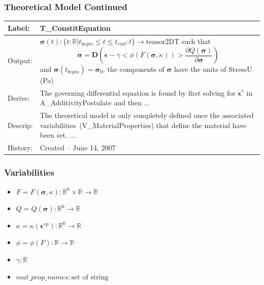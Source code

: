\documentclass[t,12pt,numbers,fleqn]{beamer}
\newcommand{\colAwidth}{0.15\textwidth}
\newcommand{\colBwidth}{0.7\textwidth}
\begin{document}
\begin{frame}

\frametitle{Theoretical Model Continued}

\begin{minipage}{\textwidth}
\begin{tabular}{| p{\colAwidth} | p{\colBwidth}|}
\hline
\rowcolor[gray]{0.9}
Label: & T\_ConstitEquation\\
\hline
Output: & $\bm{\sigma}(t): \{ t: \mathbb{R} | t_{\mathit{begin}} \leq t \leq t_{\mathit{end}} : t \} \rightarrow
\mbox{tensor2DT}$ such that 
$$\dot{\bm{\sigma}} = \mathbf{D} \left ( \dot{\bm{\epsilon}} - \gamma < \phi (F(\bm{\sigma},\kappa) ) >
\frac {
\partial Q (\bm{\sigma})}{
\partial \bm{\sigma}} \right )
$$ 
and $\bm{\sigma}(t_{\mathit{begin}}) = \bm{\sigma}_0$,
the components of $\bm{\sigma}$ have the units of StressU (Pa)\\
\hline
Derive: & The governing differential equation is found by first solving for $\dot{\bm{\epsilon}}^e$
in {A\_AdditivityPostulate} and then ...\\
\hline
Descrip: & The theoretical model is only completely defined once the associated
variabilities~({V\_MaterialProperties}) that define the
material have been set.  ...\\
\hline History: & Created -- June 14, 2007\\
\hline
\end{tabular}
\end{minipage}

\end{frame}


\begin{frame}

\frametitle{Variabilities}

\begin{itemize}
\item $F = F(\bm{\sigma}, \kappa): \mathbb{R}^6 \times \mathbb{R} \rightarrow \mathbb{R}$
\item $Q = Q(\bm{\sigma}): \mathbb{R}^6 \rightarrow \mathbb{R}$
\item $\kappa = \kappa(\bm{\epsilon}^{\mathit{vp}}): \mathbb{R}^6 \rightarrow \mathbb{R}$
\item $\phi = \phi(F): \mathbb{R} \rightarrow \mathbb{R}$
\item $\gamma: \mathbb{R}$
\item $\mathit{mat\_prop\_names}: \mbox{set of string}$
\end{itemize}

\end{frame}
\end{document}
